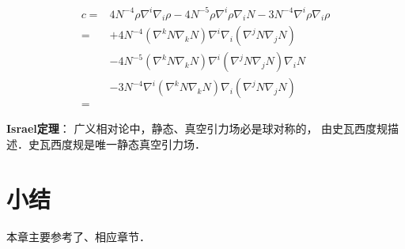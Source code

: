 \begin{align*}
    c=& 4N^{-4} \rho \nabla^i \nabla_i \rho- 4N^{-5} \rho \nabla^i \rho \nabla_i N - 3 N^{-4} \nabla^i\rho \nabla_i \rho \\
    =& + 4N^{-4} (\nabla^k N \nabla_k N) \nabla^i \nabla_i(\nabla^j N \nabla_j N) \\
    &- 4N^{-5} (\nabla^k N \nabla_k N) \nabla^i (\nabla^j N \nabla_j N) \nabla_i N \\
    &- 3 N^{-4} \nabla^i(\nabla^k N \nabla_k N) \nabla_i (\nabla^j N \nabla_j N) \\
    =&
\end{align*}

{\bfseries \heiti Israel定理}：
广义相对论中，静态、真空引力场必是球对称的，
由史瓦西度规描述．史瓦西度规是唯一静态真空引力场．

\section*{小结}
本章主要参考了\parencite[Ch.3]{chandrasekhar-1983}、\parencite{mtw1973}相应章节．

\printbibliography[heading=subbibliography,title=第\ref{chsch}章参考文献]

\endinput
